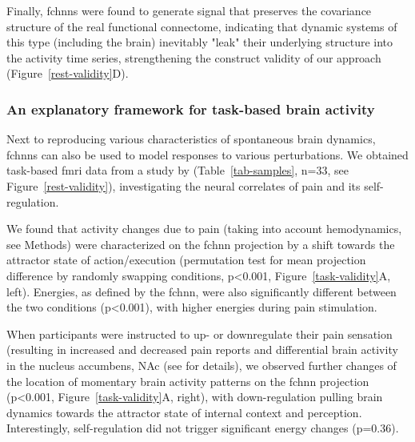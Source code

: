 \documentclass{article}
\begin{document}
Finally, \acrshort{fchnn}s were found to generate signal that preserves the covariance structure of the real functional connectome, indicating that dynamic systems of this type (including the brain) inevitably "leak" their underlying structure into the activity time series, strengthening the construct validity of our approach (Figure~\ref{rest-validity}D).

\subsubsection{An explanatory framework for task-based brain activity}

Next to reproducing various characteristics of spontaneous brain dynamics, \acrshort{fchnn}s can also be used to model responses to various perturbations. We obtained task-based \acrshort{fmri} data from a study by \citet{woo2015distinct} (Table~\ref{tab-samples}, n=33, see Figure~\ref{rest-validity}), investigating the neural correlates of pain and its self-regulation.

We found that activity changes due to pain (taking into account hemodynamics, see Methods) were characterized on the \acrshort{fchnn} projection by a shift towards the attractor state of action/execution (permutation test for mean projection difference by randomly swapping conditions, p\textless 0.001, Figure~\ref{task-validity}A, left). Energies, as defined by the \acrshort{fchnn}, were also significantly different between the two conditions (p\textless 0.001), with higher energies during pain stimulation.

When participants were instructed to up- or downregulate their pain sensation (resulting in increased and decreased pain reports and differential brain activity in the nucleus accumbens, NAc (see \cite{woo2015distinct} for details), we observed further changes of the location of momentary brain activity patterns on the \acrshort{fchnn} projection (p\textless 0.001, Figure~\ref{task-validity}A, right), with down-regulation pulling brain dynamics towards the attractor state of internal context and perception. Interestingly, self-regulation did not trigger significant energy changes (p=0.36).
\end{document}
